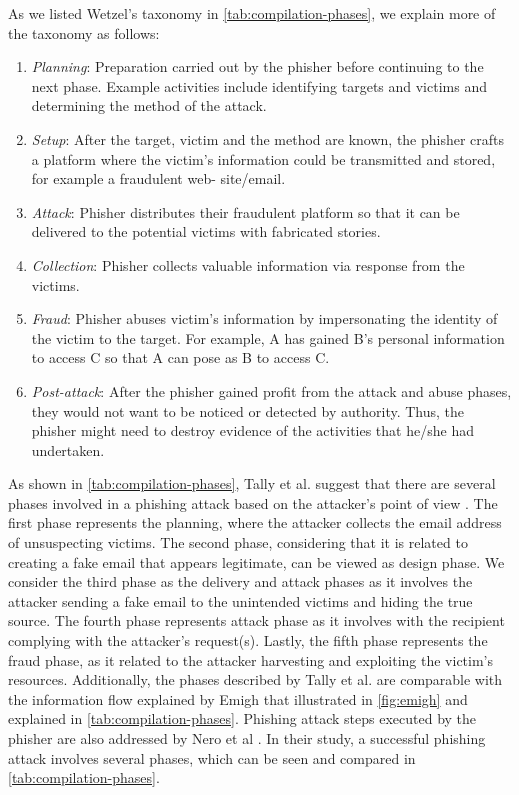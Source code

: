 As we listed Wetzel's taxonomy in \autoref{tab:compilation-phases},
we explain more of the taxonomy as follows:
\begin{enumerate}
\item \textit{Planning}: Preparation carried out by the phisher before continuing
to the next phase. Example activities include identifying targets
and victims and determining the method of the attack.
\item \textit{Setup}: After the target, victim and the method are known,
the phisher crafts a platform where the victim's information could
be transmitted and stored, for example a fraudulent web- site/email.
\item \textit{Attack}: Phisher distributes their fraudulent platform so
that it can be delivered to the potential victims with fabricated
stories.
\item \textit{Collection}: Phisher collects valuable information via response
from the victims.
\item \textit{Fraud}: Phisher abuses victim's information by impersonating
the identity of the victim to the target. For example, A has gained
B\textquoteright s personal information to access C so that A can
pose as B to access C.
\item \textit{Post-attack}: After the phisher gained profit from the attack
and abuse phases, they would not want to be noticed or detected by
authority. Thus, the phisher might need to destroy evidence of the
activities that he/she had undertaken.
\end{enumerate}
As shown in \autoref{tab:compilation-phases}, Tally et al. suggest
that there are several phases involved in a phishing attack based
on the attacker's point of view \citep{tally:2004}. The first phase
represents the planning, where the attacker collects the email address
of unsuspecting victims. The second phase, considering that it is
related to creating a fake email that appears legitimate, can be viewed
as design phase. We consider the third phase as the delivery and attack
phases as it involves the attacker sending a fake email to the unintended
victims and hiding the true source. The fourth phase represents attack
phase as it involves with the recipient complying with the attacker\textquoteright s
request(s). Lastly, the fifth phase represents the fraud phase, as
it related to the attacker harvesting and exploiting the victim's
resources. Additionally, the phases described by Tally et al. \citep{tally:2004}
are comparable with the information flow explained by Emigh\citep{emigh:2005}
that illustrated in \autoref{fig:emigh} and explained in \autoref{tab:compilation-phases}.
Phishing attack steps executed by the phisher are also addressed by
Nero et al \citep{nero:2011}. In their study, a successful phishing
attack involves several phases, which can be seen and compared in
\autoref{tab:compilation-phases}.

